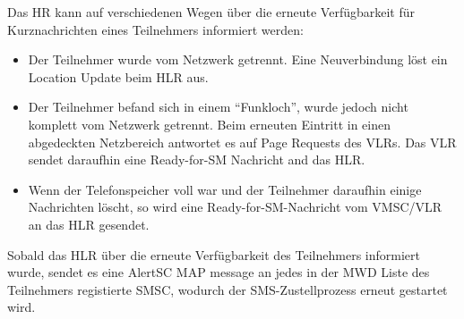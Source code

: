 \documentclass[german,12pt,a4paper]{article}
\begin{document}
Das HR kann auf verschiedenen Wegen über die erneute Verfügbarkeit für Kurznachrichten eines Teilnehmers 
informiert werden:
\begin{itemize}
    \item Der Teilnehmer wurde vom Netzwerk getrennt. Eine Neuverbindung löst ein Location Update beim 
    HLR aus.
    \item Der Teilnehmer befand sich in einem ``Funkloch'', wurde jedoch nicht komplett vom Netzwerk
    getrennt. Beim erneuten Eintritt in einen abgedeckten Netzbereich antwortet es auf Page Requests
    des VLRs. Das VLR sendet daraufhin eine Ready-for-SM Nachricht and das HLR.
    \item Wenn der Telefonspeicher voll war und der Teilnehmer daraufhin einige Nachrichten löscht, so
    wird eine Ready-for-SM-Nachricht vom VMSC/VLR an das HLR gesendet.
\end{itemize}

Sobald das HLR über die erneute Verfügbarkeit des Teilnehmers informiert wurde, sendet es eine AlertSC 
MAP message an jedes in der MWD Liste des Teilnehmers registierte SMSC, wodurch der SMS-Zustellprozess
erneut gestartet wird\cite{3gpp:map}.

\end{document}
